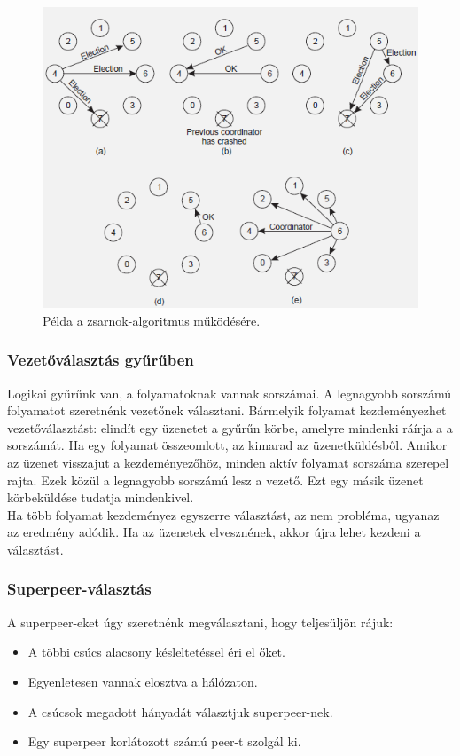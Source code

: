 \documentclass[12pt]{article}
\begin{document}
	\begin{figure}[H]
		\centering
		\includegraphics[width=0.6\linewidth]{img/zsarnok}
		\caption{Példa a zsarnok-algoritmus működésére.}
		\label{fig:zsarnok}
	\end{figure}
	
	\subsubsection{Vezetőválasztás gyűrűben}
	
	Logikai gyűrűnk van, a folyamatoknak vannak sorszámai. A legnagyobb sorszámú folyamatot szeretnénk vezetőnek választani.
	Bármelyik folyamat kezdeményezhet vezetőválasztást: elindít egy üzenetet a gyűrűn körbe, amelyre mindenki ráírja a
	a sorszámát. Ha egy folyamat összeomlott, az kimarad az üzenetküldésből. Amikor az üzenet visszajut a kezdeményezőhöz,
	minden aktív folyamat sorszáma szerepel rajta. Ezek közül a legnagyobb sorszámú lesz a vezető. Ezt egy másik
	üzenet körbeküldése tudatja mindenkivel.\\
	
	\noindent Ha több folyamat kezdeményez egyszerre választást, az nem probléma, ugyanaz az eredmény adódik. Ha az üzenetek
	elvesznének, akkor újra lehet kezdeni a választást.
	
	\subsubsection{Superpeer-választás}
	
	A superpeer-eket úgy szeretnénk megválasztani, hogy teljesüljön rájuk:
	
	\begin{itemize}
		\item	A többi csúcs alacsony késleltetéssel éri el őket.
		\item	Egyenletesen vannak elosztva a hálózaton.
		\item	A csúcsok megadott hányadát választjuk superpeer-nek.
		\item	Egy superpeer korlátozott számú peer-t szolgál ki.
	\end{itemize}
	
\end{document}
